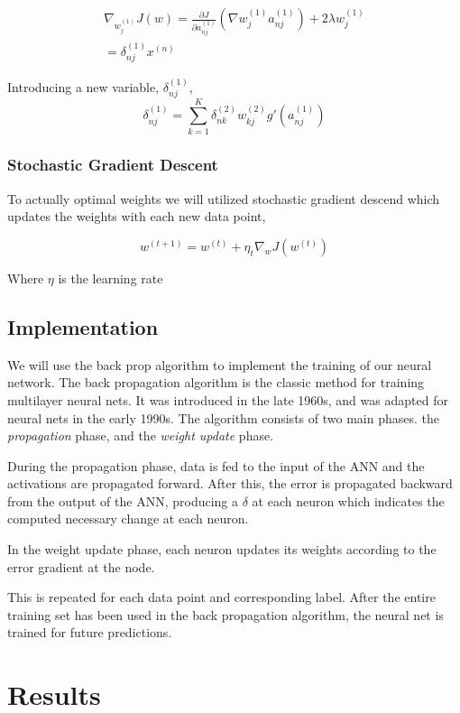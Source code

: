\documentclass[12pt, twocolumn]{article}
\begin{document}
\begin{align}
\nabla_{w_j^{(1)}} J (w)= \frac{\partial J}{\partial a^{(1)}_{nj}}  (\nabla w_j^{(1)} a_{nj}^{(1)}) + 2 \lambda w_j^{(1)}  \\
 = \delta_{nj}^{(1)}  x^{(n)}
\end{align}


Introducing a new variable, $\delta_{nj}^{(1)}$, 
\begin{equation}
\delta_{nj}^{(1)} = \sum_{k=1}^K    \delta_{nk}^{(2)} w_{kj}^{(2)} g'(a_{nj}^{(1)})
\end{equation}

\subsubsection{Stochastic Gradient Descent}
To actually  optimal weights we will utilized stochastic gradient descend which updates the weights with each new data point,

\begin{equation}
w^{(t+1)} = w^{(t)} + \eta_t \nabla_w J(w^{(t)})
\end{equation}

Where $\eta$ is the learning rate

\subsection{Implementation}
We will use the back prop algorithm to implement the training of our neural network. The back propagation algorithm is the classic method for training multilayer neural nets. It was introduced in the late 1960s, and was adapted for neural nets in the early 1990s. The algorithm consists of two main phases. the \textit{propagation} phase, and the \textit{weight update} phase.

During the propagation phase, data is fed to the input of the ANN and the activations are propagated forward. After this, the error is propagated backward from the output of the ANN, producing a $\delta$ at each neuron which indicates the computed necessary change at each neuron.

In the weight update phase, each neuron updates its weights according to the error gradient at the node.

This is repeated for each data point and corresponding label. After the entire training set has been used in the back propagation algorithm, the neural net is trained for future predictions.

\section{Results}
\end{document}
